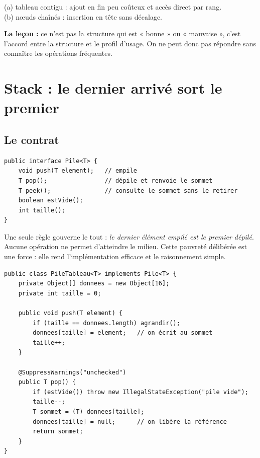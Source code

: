\documentclass[11pt,a4paper]{article}
\theoremstyle{definition}
\theoremstyle{remark}
\begin{document}
\begin{appliboxR}[Réponse]
(a) tableau contigu : ajout en fin peu coûteux et accès direct par rang.\\
(b) nœuds chaînés : insertion en tête sans décalage.

\textbf{La leçon :} ce n'est pas la structure qui est « bonne » ou
« mauvaise », c'est l'accord entre la structure et le profil d'usage. On ne
peut donc pas répondre sans connaître les opérations fréquentes.
\end{appliboxR}

\section{Stack : le dernier arrivé sort le premier}

\subsection{Le contrat}

\begin{lstlisting}[caption={L'ADT Stack}]
public interface Pile<T> {
    void push(T element);   // empile
    T pop();                // dépile et renvoie le sommet
    T peek();               // consulte le sommet sans le retirer
    boolean estVide();
    int taille();
}
\end{lstlisting}

Une seule règle gouverne le tout : \emph{le dernier élément empilé est le
premier dépilé}. Aucune opération ne permet d'atteindre le milieu. Cette
pauvreté délibérée est une force : elle rend l'implémentation efficace et le
raisonnement simple.

\begin{lstlisting}[caption={Implémentation par tableau --- les deux opérations essentielles}]
public class PileTableau<T> implements Pile<T> {
    private Object[] donnees = new Object[16];
    private int taille = 0;

    public void push(T element) {
        if (taille == donnees.length) agrandir();
        donnees[taille] = element;   // on écrit au sommet
        taille++;
    }

    @SuppressWarnings("unchecked")
    public T pop() {
        if (estVide()) throw new IllegalStateException("pile vide");
        taille--;
        T sommet = (T) donnees[taille];
        donnees[taille] = null;      // on libère la référence
        return sommet;
    }
}
\end{lstlisting}
\end{document}
